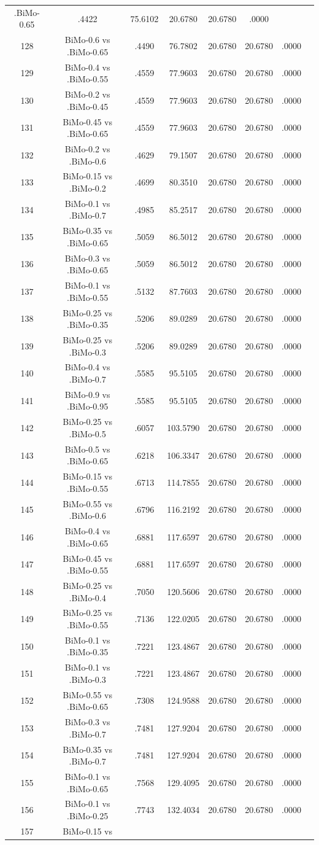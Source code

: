 \documentclass[a4paper,10pt]{article}
\begin{document}
\begin{landscape}
\begin{table}[!htp]
\begin{tabular}{cccccccc}
.BiMo-0.65&.4422&75.6102&20.6780&20.6780&.0000\\128&BiMo-0.6 vs .BiMo-0.65&.4490&76.7802&20.6780&20.6780&.0000\\129&BiMo-0.4 vs .BiMo-0.55&.4559&77.9603&20.6780&20.6780&.0000\\130&BiMo-0.2 vs .BiMo-0.45&.4559&77.9603&20.6780&20.6780&.0000\\131&BiMo-0.45 vs .BiMo-0.65&.4559&77.9603&20.6780&20.6780&.0000\\132&BiMo-0.2 vs .BiMo-0.6&.4629&79.1507&20.6780&20.6780&.0000\\133&BiMo-0.15 vs .BiMo-0.2&.4699&80.3510&20.6780&20.6780&.0000\\134&BiMo-0.1 vs .BiMo-0.7&.4985&85.2517&20.6780&20.6780&.0000\\135&BiMo-0.35 vs .BiMo-0.65&.5059&86.5012&20.6780&20.6780&.0000\\136&BiMo-0.3 vs .BiMo-0.65&.5059&86.5012&20.6780&20.6780&.0000\\137&BiMo-0.1 vs .BiMo-0.55&.5132&87.7603&20.6780&20.6780&.0000\\138&BiMo-0.25 vs .BiMo-0.35&.5206&89.0289&20.6780&20.6780&.0000\\139&BiMo-0.25 vs .BiMo-0.3&.5206&89.0289&20.6780&20.6780&.0000\\140&BiMo-0.4 vs .BiMo-0.7&.5585&95.5105&20.6780&20.6780&.0000\\141&BiMo-0.9 vs .BiMo-0.95&.5585&95.5105&20.6780&20.6780&.0000\\142&BiMo-0.25 vs .BiMo-0.5&.6057&103.5790&20.6780&20.6780&.0000\\143&BiMo-0.5 vs .BiMo-0.65&.6218&106.3347&20.6780&20.6780&.0000\\144&BiMo-0.15 vs .BiMo-0.55&.6713&114.7855&20.6780&20.6780&.0000\\145&BiMo-0.55 vs .BiMo-0.6&.6796&116.2192&20.6780&20.6780&.0000\\146&BiMo-0.4 vs .BiMo-0.65&.6881&117.6597&20.6780&20.6780&.0000\\147&BiMo-0.45 vs .BiMo-0.55&.6881&117.6597&20.6780&20.6780&.0000\\148&BiMo-0.25 vs .BiMo-0.4&.7050&120.5606&20.6780&20.6780&.0000\\149&BiMo-0.25 vs .BiMo-0.55&.7136&122.0205&20.6780&20.6780&.0000\\150&BiMo-0.1 vs .BiMo-0.35&.7221&123.4867&20.6780&20.6780&.0000\\151&BiMo-0.1 vs .BiMo-0.3&.7221&123.4867&20.6780&20.6780&.0000\\152&BiMo-0.55 vs .BiMo-0.65&.7308&124.9588&20.6780&20.6780&.0000\\153&BiMo-0.3 vs .BiMo-0.7&.7481&127.9204&20.6780&20.6780&.0000\\154&BiMo-0.35 vs .BiMo-0.7&.7481&127.9204&20.6780&20.6780&.0000\\155&BiMo-0.1 vs .BiMo-0.65&.7568&129.4095&20.6780&20.6780&.0000\\156&BiMo-0.1 vs .BiMo-0.25&.7743&132.4034&20.6780&20.6780&.0000\\157&BiMo-0.15 vs 
\end{tabular}
\end{table}
\end{landscape}
\end{document}
